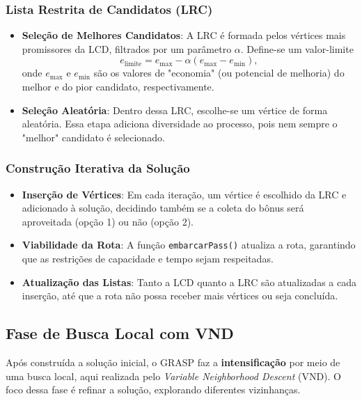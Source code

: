 \documentclass[12pt, a4paper]{report}
\begin{document}
\subsubsection*{Lista Restrita de Candidatos (LRC)}
\begin{itemize}
\item \textbf{Seleção de Melhores Candidatos}: A LRC é formada pelos vértices mais promissores da LCD, filtrados por um parâmetro $\alpha$. Define-se um valor-limite
\begin{equation}
e_{\text{limite}} = e_{\max} - \alpha (e_{\max} - e_{\min}),
\end{equation}
onde $e_{\max}$ e $e_{\min}$ são os valores de "economia" (ou potencial de melhoria) do melhor e do pior candidato, respectivamente.
\item \textbf{Seleção Aleatória}: Dentro dessa LRC, escolhe-se um vértice de forma aleatória. Essa etapa adiciona diversidade ao processo, pois nem sempre o "melhor" candidato é selecionado.
\end{itemize}

\subsubsection*{Construção Iterativa da Solução}
\begin{itemize}
\item \textbf{Inserção de Vértices}: Em cada iteração, um vértice é escolhido da LRC e adicionado à solução, decidindo também se a coleta do bônus será aproveitada (opção 1) ou não (opção 2).
\item \textbf{Viabilidade da Rota}: A função \texttt{embarcarPass()} atualiza a rota, garantindo que as restrições de capacidade e tempo sejam respeitadas.
\item \textbf{Atualização das Listas}: Tanto a LCD quanto a LRC são atualizadas a cada inserção, até que a rota não possa receber mais vértices ou seja concluída.
\end{itemize}

\subsection*{Fase de Busca Local com VND}

Após construída a solução inicial, o GRASP faz a \textbf{intensificação} por meio de uma busca local, aqui realizada pelo \emph{Variable Neighborhood Descent} (VND). O foco dessa fase é refinar a solução, explorando diferentes vizinhanças.
\end{document}
